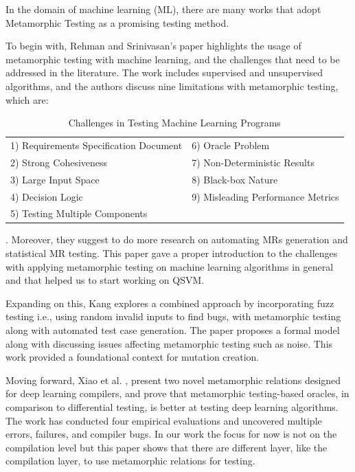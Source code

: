 \documentclass[12pt,a4paper]{article}
\begin{document}
	In the domain of machine learning (ML), there are many works that adopt Metamorphic Testing as a promising testing method. 
	
	To begin with, Rehman and Srinivasan's \cite{frehman2023} paper highlights the usage of metamorphic testing with machine learning, and the challenges that need to be addressed in the literature. The work includes supervised and unsupervised algorithms, and the authors discuss nine limitations with metamorphic testing, which are:
	
	\begin{table}[h!]
		\centering
		\caption{Challenges in Testing Machine Learning Programs}
		\label{tab:my_items_two_col}
		\begin{tabular}{ll}
			\toprule
			1) Requirements Specification Document & 6) Oracle Problem \\
			2) Strong Cohesiveness & 7) Non-Deterministic Results \\
			3) Large Input Space & 8) Black-box Nature \\
			4) Decision Logic & 9) Misleading Performance Metrics \\
			5) Testing Multiple Components & \\
			\bottomrule
		\end{tabular}
	\end{table}
	
	. Moreover, they suggest to do more research on automating MRs generation and statistical MR testing. This paper gave a proper introduction to the challenges with applying metamorphic testing on machine learning algorithms in general and that helped us to start working on QSVM. 
	
	Expanding on this, Kang \cite{dkang2022} explores a combined approach by incorporating fuzz testing i.e., using random invalid inputs to find bugs, with metamorphic testing along with automated test case generation. The paper proposes a formal model along with discussing issues affecting metamorphic testing such as noise. This work provided a foundational context for mutation creation.
	
	Moving forward, Xiao et al. \cite{dciao2022}, present two novel metamorphic relations designed for deep learning compilers, and prove that metamorphic testing-based oracles, in comparison to differential testing, is better at testing deep learning algorithms. The work has conducted four empirical evaluations and uncovered multiple errors, failures, and compiler bugs. In our work the focus for now is not on the compilation level but this paper shows that there are different layer, like the compilation layer, to use metamorphic relations for testing.  
	
\end{document}
